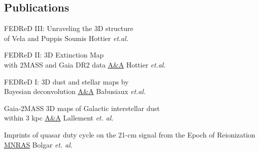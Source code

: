 \documentclass[
 a4paper, 9.5pt,
  sidebarwidth=0.28\paperwidth,
]{fortysecondscv}
\begin{document}
\makefrontsidebar

\begin{cvtable}
\end{cvtable}


\begin{cvtable}
\end{cvtable}

\subsection{Publications}
\begin{cvtable}
  {FEDReD III: Unraveling the 3D structure \\of Vela and Puppis}
  {Soumis}
  {Hottier \textit{et.al.}}

  {FEDReD II: 3D Extinction Map\\ with 2MASS and Gaia DR2 data}
  {\href{https://ui.adsabs.harvard.edu/abs/2020arXiv200703734H/abstract}{A\&A}}
  {Hottier \textit{et.al.}}

  {FEDReD I: 3D dust and stellar maps by \\Bayesian deconvolution}
  {\href{https://ui.adsabs.harvard.edu/abs/2020arXiv200704455B/abstract}{A\&A}}
  {Babusiaux \textit{et.al.}}

  {Gaia-2MASS 3D maps of Galactic interstellar dust\\within 3 kpc}
  {\href{https://ui.adsabs.harvard.edu/\#abs/2019arXiv190204116L/abstract}{A\&A}}
  {Lallement \textit{et. al.}}

  {Imprints of quasar duty cycle on the 21-cm signal from the Epoch of Reionization}
  {\href{https://ui.adsabs.harvard.edu/\#abs/2019arXiv190204116L/abstract}{MNRAS}}
  {Bolgar \textit{et. al.}}
\end{cvtable}
\end{document}
